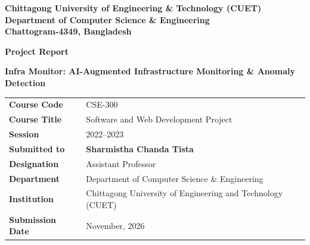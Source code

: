 \documentclass[12pt,a4paper,oneside]{report}
\newcommand{\reporttitle}{Infra Monitor}
\begin{document}
\setcounter{page}{1}
\begin{titlepage}
\centering
{\large\bfseries Chittagong University of Engineering \& Technology (CUET)\\
Department of Computer Science \& Engineering\\
Chattogram-4349, Bangladesh\par}
\vspace{1.0cm}
{\Large\bfseries Project Report\par}
\vspace{0.4cm}
{\large\bfseries\color{cuetblue}\reporttitle: AI-Augmented Infrastructure Monitoring \& Anomaly Detection\par}
\vspace{0.8cm}
\begin{tabularx}{0.95\textwidth}{>{\bfseries}p{} X}
\toprule
Course Code & CSE-300\\
Course Title & Software and Web Development Project\\
Session & 2022--2023\\
Submitted to & \textbf{Sharmistha Chanda Tista}\\
Designation & Assistant Professor\\
Department & Department of Computer Science \& Engineering\\
Institution & Chittagong University of Engineering and Technology (CUET)\\
Submission Date & November, 2026\\
\bottomrule
\end{tabularx}


\end{titlepage}
\end{document}
